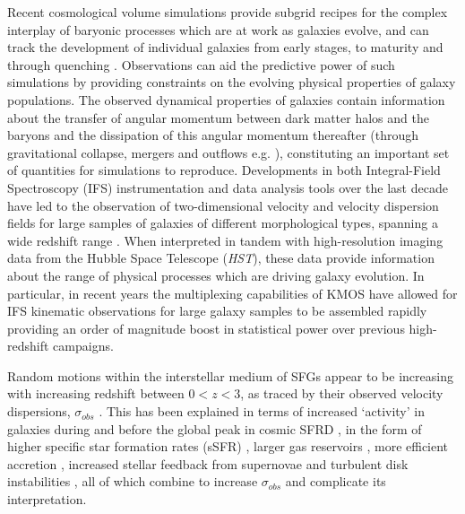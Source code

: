 \documentclass[fleqn,usenatbib]{mn2e}
\begin{document}
Recent cosmological volume simulations provide subgrid recipes for the complex interplay of baryonic processes which are at work as galaxies evolve, and can track the development of individual galaxies from early stages, to maturity and through quenching \citep{Dubois2014a,Vogelsberger2014b,Schaye2015}.
Observations can aid the predictive power of such simulations by providing constraints on the evolving physical properties of galaxy populations.
The observed dynamical properties of galaxies contain information about the transfer of angular momentum between dark matter halos and the baryons and the dissipation of this angular momentum thereafter (through gravitational collapse, mergers and outflows e.g. \citealt{Fall1983,Romanowsky2012,Fall2013}), constituting an important set of quantities for simulations to reproduce.
Developments in both Integral-Field Spectroscopy (IFS) instrumentation and data analysis tools over the last decade have led to the observation of two-dimensional velocity and velocity dispersion fields for large samples of galaxies of different morphological types, spanning a wide redshift range \citep[e.g.][]{Sarzi2005,Flores2006,Epinat2008,ForsterSchreiber2009,Cappellari2011,Gnerucci2011,Epinat2012,Croom2012,Swinbank2012,Swinbank2012a,Bundy2015,Wisnioski2015,Stott2016,Harrison2017,Swinbank2017}.
When interpreted in tandem with high-resolution imaging data from the Hubble Space Telescope ({\em HST}), these data provide information about the range of physical processes which are driving galaxy evolution.
In particular, in recent years the multiplexing capabilities of KMOS \citep{Sharples2013} have allowed for IFS kinematic observations for large galaxy samples to be assembled rapidly \citep{Sobral2013,Wisnioski2015,Stott2016,Mason2016,Harrison2017} providing an order of magnitude boost in statistical power over previous high-redshift campaigns.    

Random motions within the interstellar medium of SFGs appear to be increasing with increasing redshift between $0 < z < 3$, as traced by their observed velocity dispersions, $\sigma_{obs}$ \citep{Genzel2008,ForsterSchreiber2009,Law2009,Cresci2009,Gnerucci2011,Epinat2012,Kassin2012,Green2014,Wisnioski2015,Stott2016}.
This has been explained in terms of increased `activity' in galaxies during and before the global peak in cosmic SFRD \citep{Madau_2014}, in the form of higher specific star formation rates (sSFR) \citep{Wisnioski2015}, larger gas reservoirs \citep{Law2009,ForsterSchreiber2009,Wisnioski2015,Stott2016}, more efficient accretion \citep{Law2009}, increased stellar feedback from supernovae \citep{Kassin2012} and turbulent disk instabilities \citep{Law2009,Bournaud2007,Bournaud2016}, all of which combine to increase $\sigma_{obs}$ and complicate its interpretation.
\end{document}
